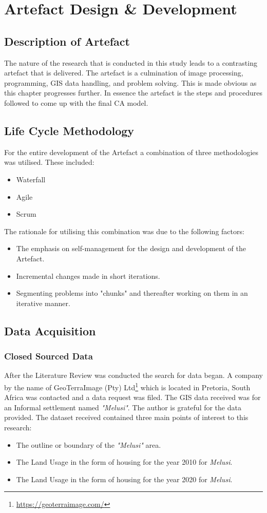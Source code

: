 
\chapter{Artefact Design \& Development} %
\label{Chapter3} %
\section{Description of Artefact}
The nature of the research that is conducted in this study leads to a contrasting artefact that is delivered. The artefact is a culmination of image processing, programming, GIS data handling, and problem solving. This is made obvious as this chapter progresses further. In essence the artefact is the steps and procedures followed to come up with the final CA model.
\section{Life Cycle Methodology}
For the entire development of the Artefact a combination of three methodologies was utilised. These included:
\begin{itemize}
\item Waterfall
\item Agile
\item Scrum
\end{itemize}
The rationale for utilising this combination was due to the following factors:
\begin{itemize}
\item The emphasis on self-management for the design and development of the Artefact.
\item Incremental changes made in short iterations.
\item Segmenting problems into "chunks" and thereafter working on them in an iterative manner.
\end{itemize}
\section{Data Acquisition}
\subsection{Closed Sourced Data}
After the Literature Review was conducted the search for data began. A company by the name of GeoTerraImage (Pty) Ltd\footnote{\url{https://geoterraimage.com/}} which is located in Pretoria, South Africa was contacted and a data request was filed. The GIS data received was for an Informal settlement named \textit{"Melusi"}. The author is grateful for the data provided. The dataset received contained three main points of interest to this research:
\begin{itemize}
\item The outline or boundary of the \textit{"Melusi"} area.
\item The Land Usage in the form of housing for the year 2010 for \textit{Melusi}.
\item The Land Usage in the form of housing for the year 2020 for \textit{Melusi}.
\end{itemize}
